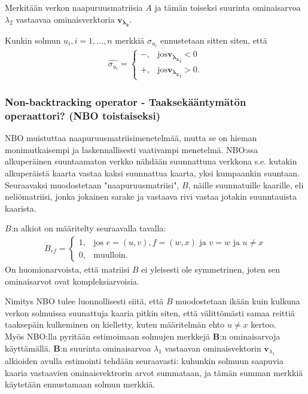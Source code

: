 \documentclass[finnish,12pt,a4paper,pdftex,sci,utf8]{aaltothesis}
\begin{document}
Merkitään verkon naapuruusmatriisia $A$ ja tämän toiseksi suurinta ominaisarvoa $\lambda_2$ vastaavaa ominaisverktoria $\mathbf{v_{\lambda_2}}$.

Kunkin solmun $u_i, i = 1, \ldots, n$ merkkiä $\sigma_{u_i}$ ennustetaan sitten siten, että 
\begin{align*}
	\hat{\sigma_{u_i}} = 
	\begin{cases}
		-, & \text{jos} \mathbf{v_{\lambda_2}}_i < 0 \\
		+, & \text{jos} \mathbf{v_{\lambda_2}}_i > 0.
	\end{cases}
\end{align*}

\subsubsection{Non-backtracking operator - Taaksekääntymätön operaattori? (NBO toistaiseksi)}
NBO muistuttaa naapuruusmatriisimenetelmää, mutta se on hieman monimutkaisempi ja laskennallisesti vaativampi menetelmä. NBO:ssa alkuperäinen suuntaamaton verkko nähdään suunnattuna verkkona s.e. kutakin alkuperäistä kaarta vastaa kaksi suunnattua kaarta, yksi kumpaankin suuntaan. Seuraavaksi muodostetaan "naapuruusmatriisi", $B$, näille suunnatuille kaarille, eli neliömatriisi, jonka jokainen sarake ja vastaava rivi vastaa jotakin suunntauista kaarista. 

$B$:n alkiot on määritelty seuraavalla tavalla:
\begin{align*}
	B_{ef} = 
	\begin{cases}
		1,& \text{jos } e = (u,v), f = (w,x) \text{ ja } v = w \text{ ja } u \neq x \\
		0,& \text{muulloin.}
	\end{cases}
\end{align*}
On huomionarvoista, että matriisi $B$ ei yleisesti ole symmetrinen, joten sen ominaisarvot ovat kompleksiarvoisia.

Nimitys NBO tulee luonnollisesti siitä, että $B$ muodostetaan ikään kuin kulkuna verkon solmuissa suunattuja kaaria pitkin siten, että välittömästi samaa reittiä taaksepäin kulkeminen on kielletty, kuten määritelmän ehto $u \neq x$ kertoo. \\

Myös NBO:lla pyritään estimoimaan solmujen merkkejä $\mathbf{B}$:n ominaisarvoja käyttämällä. $\mathbf{B}$:n suurinta ominaisarvoa $\lambda_1$ vastaavan ominaisvektorin $\mathbf{v}_{\lambda_1}$ alkioiden avulla estimointi tehdään seuraavasti: kuhunkin solmuun saapuvia kaaria vastaavien ominaisvektrorin arvot summataan, ja tämän summan merkkiä käytetään ennustamaan solmun merkkiä. 
\end{document}
